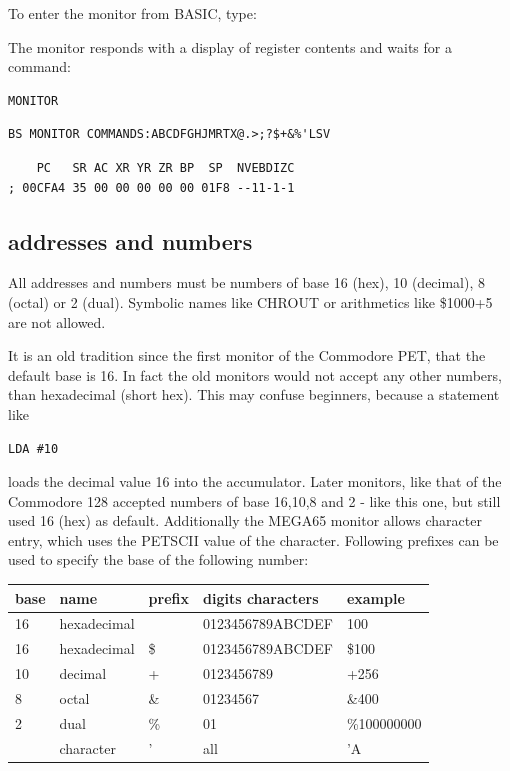 To enter the monitor from BASIC, type:

The monitor responds with a display of register contents and waits for a command:

\begin{tcolorbox}[colback=blue,coltext=white]
\verbatimfont{\codefont}
\begin{verbatim}
MONITOR
\end{verbatim}
\begin{tcolorbox}[colback=yellow,coltext=blue,,arc=0mm,boxrule=0mm,
       left*=0.5mm,right*=0mm,top=0mm,bottom=0mm,nobeforeafter,
       left skip=0.1mm,
       width=50mm,height=3mm,valign=center]
\begin{verbatim}
BS MONITOR COMMANDS:ABCDFGHJMRTX@.>;?$+&%'LSV
\end{verbatim}
\end{tcolorbox}
\begin{verbatim}
    PC   SR AC XR YR ZR BP  SP  NVEBDIZC
; 00CFA4 35 00 00 00 00 00 01F8 --11-1-1
\end{verbatim}
\end{tcolorbox}

\subsection{addresses and numbers}

All addresses and numbers must be numbers of base 16 (hex),
10 (decimal), 8 (octal) or 2 (dual). Symbolic names like CHROUT
or arithmetics like \$1000+5 are not allowed.

It is an old tradition since the first monitor of the Commodore PET,
that the default base is 16. In fact the old monitors would not
accept any other numbers, than hexadecimal (short hex).
This may confuse beginners, because a statement like
\begin{verbatim}
LDA #10
\end{verbatim}
loads the decimal value 16 into the accumulator.
Later monitors, like that of the Commodore 128 accepted numbers of
base 16,10,8 and 2 - like this one, but still used 16 (hex) as default.
Additionally the MEGA65 monitor allows character entry, which uses
the PETSCII value of the character.
Following prefixes can be used to specify the base of the following number:

{\ttfamily
{\setlength{\tabcolsep}{1mm}
\begin{tabular}{|l|l|l|l|l|}
\hline
 base  & name & prefix & digits characters & example     \\
\hline
16 & hexadecimal  &     & 0123456789ABCDEF &   100       \\
16 & hexadecimal  & \$  & 0123456789ABCDEF & \$100       \\
10 & decimal      &  +  & 0123456789       & +256        \\
 8 & octal        & \&  & 01234567         & \&400       \\
 2 & dual         & \%  & 01               & \%100000000 \\
   & character    &  '  & all              & 'A          \\
\hline
\end{tabular}
}
}


